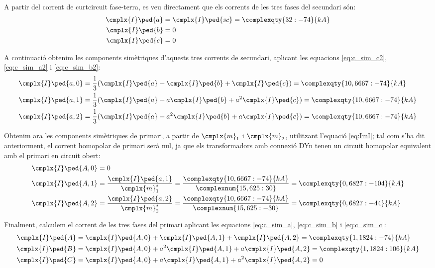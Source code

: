 \begin{exemple}[\CCasimSecTrafo{}]
    A partir del corrent de curtcircuit fase-terra, es veu directament que els corrents de les tres fases del secundari són:
    \begin{align*}
        \cmplx{I}\ped{a} &= \cmplx{I}\ped{sc} = \complexqty{32:-74}{kA} \\
        \cmplx{I}\ped{b} &= 0  \\
        \cmplx{I}\ped{c} &= 0
    \end{align*}

    A continuació obtenim les components simètriques d'aquests tres corrents de secundari, aplicant les equacions \eqref{eq:c_sim_c2}, \eqref{eq:c_sim_a2} i \eqref{eq:c_sim_b2}:
    \begin{align*}
        \cmplx{I}\ped{a,0} &= \frac{1}{3} (\cmplx{I}\ped{a} + \cmplx{I}\ped{b} +
        \cmplx{I}\ped{c}) = \complexqty{10,6667:-74}{kA} \\
        \cmplx{I}\ped{a,1} &= \frac{1}{3} (\cmplx{I}\ped{a} + a \cmplx{I}\ped{b} +
         a^2 \cmplx{I}\ped{c}) = \complexqty{10,6667:-74}{kA}  \\
        \cmplx{I}\ped{a,2} &= \frac{1}{3} (\cmplx{I}\ped{a} + a^2 \cmplx{I}\ped{b} +
         a \cmplx{I}\ped{c}) = \complexqty{10,6667:-74}{kA}
    \end{align*}

    Obtenim ara les components simètriques de primari, a partir de $\cmplx{m}_1$ i $\cmplx{m}_2$, utilitzant l'equació \eqref{eq:ImI}; tal com s'ha dit anteriorment, el corrent homopolar de primari serà nul, ja que els transformadors amb connexió DYn tenen un circuit homopolar equivalent amb el primari en circuit obert:
    \begin{align*}
        \cmplx{I}\ped{A,0} &= 0 \\
        \cmplx{I}\ped{A,1} &= \frac{\cmplx{I}\ped{a,1}}{\cmplx{m}^*_1} = \frac{\complexqty{10,6667:-74}{kA}}{\complexnum{15,625:30}} =  \complexqty{0,6827:-104}{kA} \\
        \cmplx{I}\ped{A,2} &= \frac{\cmplx{I}\ped{a,2}}{\cmplx{m}^*_2} = \frac{\complexqty{10,6667:-74}{kA}}{\complexnum{15,625:-30}} = \complexqty{0,6827:-44}{kA}
    \end{align*}

    Finalment, calculem el corrent de les tres fases del primari aplicant les equacions \eqref{eq:c_sim_a}, \eqref{eq:c_sim_b} i \eqref{eq:c_sim_c}:
     \begin{align*}
        \cmplx{I}\ped{A} &= \cmplx{I}\ped{A,0} + \cmplx{I}\ped{A,1} + \cmplx{I}\ped{A,2} = \complexqty{1,1824:-74}{kA} \\
        \cmplx{I}\ped{B} &= \cmplx{I}\ped{A,0} + a^2 \cmplx{I}\ped{A,1} + a \cmplx{I}\ped{A,2} = \complexqty{1,1824:106}{kA} \\
        \cmplx{I}\ped{C} &= \cmplx{I}\ped{A,0} + a \cmplx{I}\ped{A,1} + a^2 \cmplx{I}\ped{A,2} = 0
    \end{align*}


\end{exemple}

